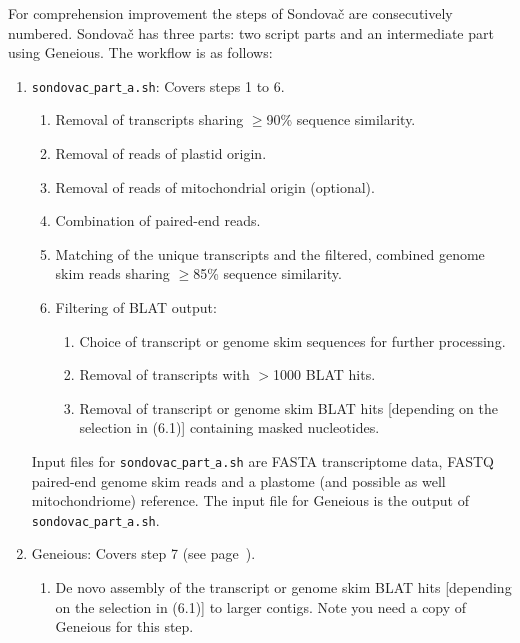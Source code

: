 \documentclass[a4paper, 11pt, twoside]{article}
\begin{document}
For comprehension improvement the steps of Sondovač are consecutively numbered. Sondovač has three parts: two script parts and an intermediate part using Geneious. The workflow is as follows:

\begin{enumerate}[label=\textbf{\Alph*.}]
  \label{pipeline-overview}
  \item \texttt{sondovac$\_$part$\_$a.sh}: Covers steps 1 to 6.
    \begin{enumerate}[label=\textbf{\arabic*.}]
      \item Removal of transcripts sharing $\geq$90\% sequence similarity.
      \item Removal of reads of plastid origin.
      \item Removal of reads of mitochondrial origin (optional).
      \item Combination of paired-end reads.
      \item Matching of the unique transcripts and the filtered, combined genome skim reads sharing $\geq$85\% sequence similarity.
      \item Filtering of BLAT output:
	\begin{enumerate}[label=\textbf{6.\arabic*.}]
	\item Choice of transcript or genome skim sequences for further processing.
	\item Removal of transcripts with $>$1000 BLAT hits.
	\item Removal of transcript or genome skim BLAT hits [depending on the selection in (6.1)] containing masked nucleotides.
	\end{enumerate}
    \end{enumerate}

  Input files for \texttt{sondovac$\_$part$\_$a.sh} are FASTA transcriptome data, FASTQ paired-end genome skim reads and a plastome (and possible as well mitochondriome) reference. The input file for Geneious is the output of \texttt{sondovac$\_$part$\_$a.sh}.

  \item Geneious: Covers step 7 (see page~\pageref{geneious}).
    \begin{enumerate}[label=\textbf{\arabic*.}, resume]
    \item De novo assembly of the transcript or genome skim BLAT hits [depending on the selection in (6.1)] to larger contigs. Note you need a copy of Geneious for this step.
    \end{enumerate}


\end{enumerate}
\end{document}
